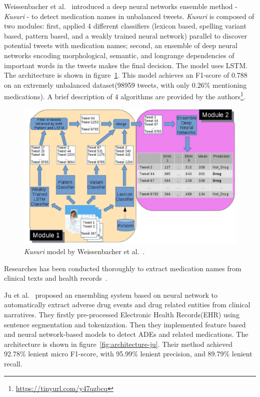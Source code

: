 Weissenbacher et al.~\cite{weissenbacher2019deep} introduced a deep neural networks ensemble method - \textit{Kusuri} - to detect medication names in unbalanced tweets. \textit{Kusuri} is composed of two modules: first, applied 4 different classifiers (lexicon based, spelling variant based, pattern based, and a weakly trained neural network) parallel to discover potential tweets with medication names; second, an ensemble of deep neural networks encoding morphological, semantic, and longrange dependencies of important words in the tweets makes the final decision. The model uses LSTM. The architecture is shown in figure~\ref{fig:architecture-weissenbacher}. This model achieves an F1-score of 0.788 on an extremely unbalanced dataset(98959 tweets, with only 0.26\% mentioning medications). A brief description of 4 algorithms are provided by the authors\footnote{\url{https://tinyurl.com/y47qzbcq}}.

\begin{figure}[h]
	\centering
	\includegraphics[width=0.99\linewidth]{Figures/a.png}
	\caption{\textit{Kusuri} model by Weissenbacher et al.~\cite{weissenbacher2019deep}.}
	\label{fig:architecture-weissenbacher}
\end{figure}

Researches has been conducted thoroughly to extract medication names from clinical texts and health records~\cite{weeks2020medextractr, kim2020ensemble, ju2020ensemble}.

Ju et al.~\cite{ju2020ensemble} proposed an ensembling system based on neural network to automatically extract adverse drug events and drug related entities from clinical narratives. They firstly pre-processed Electronic Health Records(EHR) using sentence segmentation and tokenization. Then they implemented feature based and neural network-based models to detect ADEs and related medications. The architecture is shown in figure~\ref{fig:architecture-ju}. Their method achieved 92.78\% lenient micro F1-score, with 95.99\% lenient precision, and 89.79\% lenient recall.

